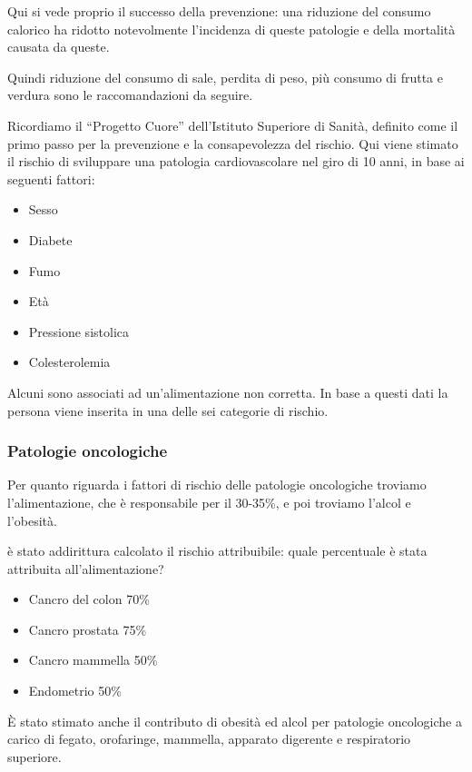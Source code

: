 Qui si vede proprio il successo della prevenzione: una riduzione del
consumo calorico ha ridotto notevolmente l'incidenza di queste patologie
e della mortalità causata da queste.

Quindi riduzione del consumo di sale, perdita di peso, più consumo di
frutta e verdura sono le raccomandazioni da seguire.

Ricordiamo il ``Progetto Cuore'' dell'Istituto Superiore di Sanità,
definito come il primo passo per la prevenzione e la consapevolezza del
rischio. Qui viene stimato il rischio di sviluppare una patologia
cardiovascolare nel giro di 10 anni, in base ai seguenti fattori:

\begin{itemize}
\item
  Sesso
\item
  Diabete
\item
  Fumo
\item
  Età
\item
  Pressione sistolica
\item
  Colesterolemia
\end{itemize}

Alcuni sono associati ad un'alimentazione non corretta. In base a questi
dati la persona viene inserita in una delle sei categorie di rischio.

\subsubsection{Patologie oncologiche}

Per quanto riguarda i fattori di rischio delle patologie oncologiche
troviamo l'alimentazione, che è responsabile per il 30-35\%, e poi
troviamo l'alcol e l'obesità.

è stato addirittura calcolato il rischio attribuibile: quale percentuale
è stata attribuita all'alimentazione?

\begin{itemize}
\item
  Cancro del colon 70\%
\item
  Cancro prostata 75\%
\item
  Cancro mammella 50\%
\item
  Endometrio 50\%
\end{itemize}

È stato stimato anche il contributo di obesità ed alcol per patologie
oncologiche a carico di fegato, orofaringe, mammella, apparato digerente
e respiratorio superiore.

